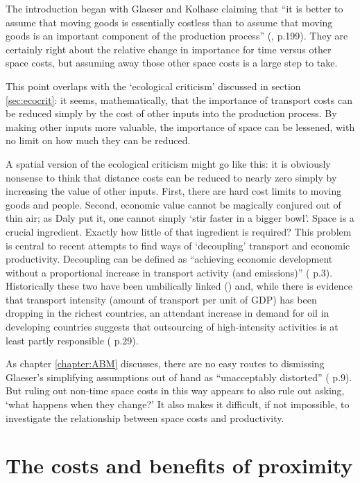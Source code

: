 {The introduction began with Glaeser and Kolhase claiming that ``it is better to assume that moving goods is essentially costless than to assume that moving goods is an important component of the production process'' (\citealt{glaeser_cities_2004}, p.199). They are certainly right about the relative change in importance for time versus other space costs, but assuming away those other space costs is a large step to take. 

This point overlaps with the `ecological criticism' discussed in section \ref{sec:ecocrit}: it seems, mathematically, that the importance of transport costs can be reduced simply by  the cost of other inputs into the production process. By making other inputs more valuable, the importance of space can be lessened, with no limit on how much they can be reduced. 

A spatial version of the ecological criticism might go like this: it is obviously nonsense to think that distance costs can be reduced to nearly zero simply by increasing the value of other inputs. First, there are hard cost limits to moving goods and people. Second, economic value cannot be magically conjured out of thin air; as Daly put it, one cannot simply `stir faster in a bigger bowl'. Space is a crucial ingredient. Exactly how little of that ingredient is required? This problem is central to recent attempts to find ways of `decoupling' transport and economic productivity. Decoupling can be defined as ``achieving economic development without a proportional increase in transport activity (and emissions)” (\citealt{gray_decoupling_2006} p.3). Historically these two have been umbilically linked (\citealt{echenique_separating_2002}) and, while there is evidence that transport intensity (amount of transport per unit of GDP) has been dropping in the richest countries, an attendant increase in demand for oil in developing countries suggests that outsourcing of high-intensity activities is at least partly responsible (\citealt{roberts_oil_2010} p.29). 

As chapter \ref{chapter:ABM} discusses, there are no easy routes to dismissing Glaeser's simplifying assumptions out of hand as ``unacceptably distorted'' (\citealt{granovetter_sociology_2001} p.9). But ruling out non-time space costs in this way appears to also rule out asking, `what happens when they change?' It also makes it difficult, if not impossible, to investigate the relationship between space costs and productivity. 

\section{The costs and benefits of proximity \label{sec:extsinspace}}

}
